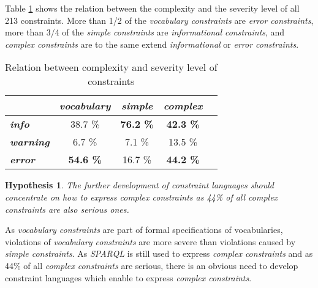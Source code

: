 \documentclass{llncs}
\newtheorem{hyp}{Hypothesis}
\begin{document}
Table \ref{tab:evaluation-complexity-severity} shows the relation between the complexity and the severity level of all 213 constraints.
More than 1/2 of the \emph{vocabulary constraints} are \emph{error constraints},
more than 3/4 of the \emph{simple constraints} are \emph{informational constraints}, and
\emph{complex constraints} are to the same extend \emph{informational} or \emph{error constraints}. 

\begin{table}[H]
		\scriptsize
    \begin{center}
    \begin{tabular}{@{}lcccc@{}}
    \\       \textbf{}
           & \textbf{\emph{vocabulary}}
           & \textbf{\emph{simple}}
					 & \textbf{\emph{complex}}
    \\ \midrule
		\textbf{\emph{info}} & 38.7 \% & \textbf{76.2 \%} & \textbf{42.3 \%} \\
		\textbf{\emph{warning}} & 6.7 \% & 7.1 \% & 13.5 \% \\
		\textbf{\emph{error}} & \textbf{54.6 \%} & 16.7 \% & \textbf{44.2 \%} \\
    \bottomrule
    \end{tabular}
    \caption{Relation between complexity and severity level of constraints}
		\label{tab:evaluation-complexity-severity}
    \end{center}
\end{table}

\begin{hyp}
The further development of constraint languages should concentrate on how to express complex constraints as 44\% of all complex constraints are also serious ones.
\end{hyp}

As \emph{vocabulary constraints} are part of formal specifications of vocabularies,
violations of \emph{vocabulary constraints} are more severe than violations caused by \emph{simple constraints}.
As \emph{SPARQL} is still used to express \emph{complex constraints} and as 44\% of all \emph{complex constraints} are serious,
there is an obvious need to develop constraint languages which enable to express \emph{complex constraints}.
\end{document}
